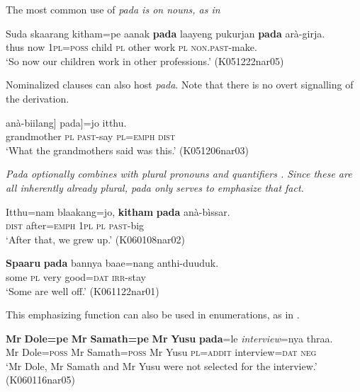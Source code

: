 The most common use of \em pada \em is on nouns, as in 

\ea \label{ex:pada:nouns}
\gll Suda skaarang    kitham=pe  aanak \textbf{pada}    laayeng pukurjan \textbf{pada}    arà-girja. \\
     thus now \textsc{1pl}=\textsc{poss} child \textsc{pl} other work \textsc{pl} \textsc{non.past}-make. \\
    `So now our children work in other professions.' (K051222nar05)
\z

Nominalized clauses can also host {\em pada}. Note that there is no overt signalling of the derivation.

\ea\label{ex:form:pada:headless2}
   \gll [[[Neene       pada] anà-biilang] \zero{} pada]=jo  itthu. \\
     grandmother \textsc{pl}  \textsc{past}-say  { }  \textsc{pl}=\textsc{emph} \textsc{dist} \\
`What the grandmothers said was this.' (K051206nar03)
\z

\em Pada \em optionally combines with plural pronouns   and quantifiers . Since these are all inherently already plural,  \em pada \em only serves to emphasize that fact.

\ea \label{ex:pada:pron}
\gll Itthu=nam blaakang=jo, \textbf{kitham} \textbf{pada} anà-bìssar. \\
 \textsc{dist} after=\textsc{emph} 1\textsc{pl} \textsc{pl} \textsc{past}-big\\
`After that, we grew up.' (K060108nar02)
\z
 
\ea \label{ex:pada:quant}
\gll \textbf{Spaaru} \textbf{pada} bannya baae=nang anthi-duuduk. \\
     some \textsc{pl} very good=\textsc{dat} \textsc{irr}-stay \\
    `Some are well off.'  (K061122nar01)
\z

This emphasizing function can also be used in enumerations, as in .

\ea \label{ex:pada:enum}
\gll \textbf{Mr} \textbf{Dole=pe} \textbf{Mr} \textbf{Samath=pe} \textbf{Mr} \textbf{Yusu} \textbf{pada}=le {\em interview}=nya thraa. \\
Mr Dole=\textsc{poss} Mr Samath=\textsc{poss} Mr Yusu \textsc{pl}=\textsc{addit} interview=\textsc{dat} \textsc{neg}\\
`Mr Dole, Mr Samath and Mr Yusu were not selected for the interview.' (K060116nar05)
\z

